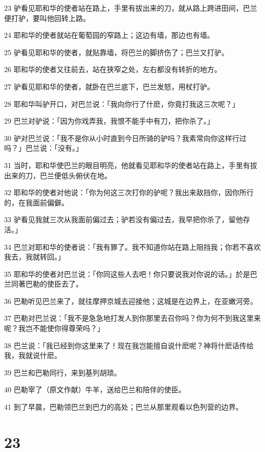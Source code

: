 \par 23 驴看见耶和华的使者站在路上，手里有拔出来的刀，就从路上跨进田间，巴兰便打驴，要叫他回转上路。
\par 24 耶和华的使者就站在葡萄园的窄路上；这边有墙，那边也有墙。
\par 25 驴看见耶和华的使者，就贴靠墙，将巴兰的脚挤伤了；巴兰又打驴。
\par 26 耶和华的使者又往前去，站在狭窄之处，左右都没有转折的地方。
\par 27 驴看见耶和华的使者，就卧在巴兰底下，巴兰发怒，用杖打驴。
\par 28 耶和华叫驴开口，对巴兰说：「我向你行了什麽，你竟打我这三次呢？」
\par 29 巴兰对驴说：「因为你戏弄我，我恨不能手中有刀，把你杀了。」
\par 30 驴对巴兰说：「我不是你从小时直到今日所骑的驴吗？我素常向你这样行过吗？」巴兰说：「没有。」
\par 31 当时，耶和华使巴兰的眼目明亮，他就看见耶和华的使者站在路上，手里有拔出来的刀，巴兰便低头俯伏在地。
\par 32 耶和华的使者对他说：「你为何这三次打你的驴呢？我出来敌挡你，因你所行的，在我面前偏僻。
\par 33 驴看见我就三次从我面前偏过去；驴若没有偏过去，我早把你杀了，留他存活。」
\par 34 巴兰对耶和华的使者说：「我有罪了。我不知道你站在路上阻挡我；你若不喜欢我去，我就转回。」
\par 35 耶和华的使者对巴兰说：「你同这些人去吧！你只要说我对你说的话。」於是巴兰同著巴勒的使臣去了。
\par 36 巴勒听见巴兰来了，就往摩押京城去迎接他；这城是在边界上，在亚嫩河旁。
\par 37 巴勒对巴兰说：「我不是急急地打发人到你那里去召你吗？你为何不到我这里来呢？我岂不能使你得尊荣吗？」
\par 38 巴兰说：「我已经到你这里来了！现在我岂能擅自说什麽呢？神将什麽话传给我，我就说什麽。
\par 39 巴兰和巴勒同行，来到基列胡琐。
\par 40 巴勒宰了（原文作献）牛羊，送给巴兰和陪伴的使臣。
\par 41 到了早晨，巴勒领巴兰到巴力的高处；巴兰从那里观看以色列营的边界。

\chapter{23}

